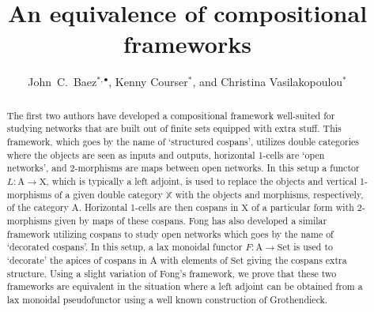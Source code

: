 \documentclass{amsart}
\title{An equivalence of compositional frameworks}
\author{John\ C.\ Baez$^{*,\bullet}$, Kenny Courser$^*$, and Christina Vasilakopoulou$^*$}
\begin{document}
\begin{abstract}
\noindent
The first two authors have developed a compositional framework well-suited for studying networks that are built out of finite sets equipped with extra stuff. This framework, which goes by the name of `structured cospans', utilizes double categories where the objects are seen as inputs and outputs, horizontal 1-cells are `open networks', and 2-morphisms are maps between open networks. In this setup a functor $L \colon \textrm{A} \to \textrm{X}$, which is typically a left adjoint, is used to replace the objects and vertical 1-morphisms of a given double category $\mathbb{X}$ with the objects and morphisms, respectively, of the category $\textrm{A}$. Horizontal 1-cells are then cospans in $\textrm{X}$ of a particular form with 2-morphisms given by maps of these cospans. Fong has also developed a similar framework utilizing cospans to study open networks which goes by the name of `decorated cospans'. In this setup, a lax monoidal functor $F \colon \textrm{A} \to \textrm{Set}$ is used to `decorate' the apices of cospans in $\textrm{A}$ with elements of $\textrm{Set}$ giving the cospans extra structure. Using a slight variation of Fong's framework, we prove that these two frameworks are equivalent in the situation where a left adjoint can be obtained from a lax monoidal pseudofunctor using a well known construction of Grothendieck.
\end{abstract}

\maketitle
\end{document}
